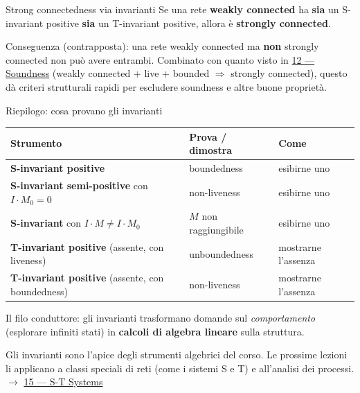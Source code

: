\begin{boxtheorem}{Strong connectedness via invarianti}
Se una rete \textbf{weakly connected} ha \textbf{sia} un S-invariant positive \textbf{sia} un T-invariant positive, allora è \textbf{strongly connected}.

Conseguenza (contrapposta): una rete weakly connected ma \textbf{non} strongly connected non può avere entrambi. Combinato con quanto visto in \hyperref[ch:12]{12 — Soundness} (weakly connected + live + bounded $\Longrightarrow$ strongly connected), questo dà criteri strutturali rapidi per escludere soundness e altre buone proprietà.
\end{boxtheorem}

\begin{boxabstract}{Riepilogo: cosa provano gli invarianti}
\begingroup\small
\begin{tabularx}{\linewidth}{>{\raggedright\arraybackslash}X>{\raggedright\arraybackslash}X>{\raggedright\arraybackslash}X}
\toprule
\textbf{Strumento} & \textbf{Prova / dimostra} & \textbf{Come} \\
\midrule
\textbf{S-invariant positive} & boundedness & esibirne uno \\
\textbf{S-invariant semi-positive} con $I\cdot M_0 = 0$ & non-liveness & esibirne uno \\
\textbf{S-invariant} con $I\cdot M \ne I\cdot M_0$ & $M$ non raggiungibile & esibirne uno \\
\textbf{T-invariant positive} (assente, con liveness) & unboundedness & mostrarne l'assenza \\
\textbf{T-invariant positive} (assente, con boundedness) & non-liveness & mostrarne l'assenza \\
\bottomrule
\end{tabularx}
\endgroup

Il filo conduttore: gli invarianti trasformano domande sul \emph{comportamento} (esplorare infiniti stati) in \textbf{calcoli di algebra lineare} sulla struttura.
\end{boxabstract}

Gli invarianti sono l'apice degli strumenti algebrici del corso. Le prossime lezioni li applicano a classi speciali di reti (come i sistemi S e T) e all'analisi dei processi. $\rightarrow$ \hyperref[ch:15]{15 — S-T Systems}